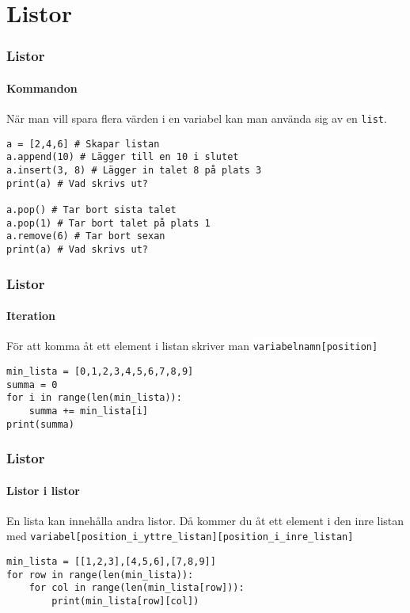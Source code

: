 \documentclass[aspectratio=169]{beamer}
\newcommand{\code}[1]{\colorbox{white}{\lstinline{#1}}}
\begin{document}
\section{Listor}

\begin{frame}[fragile]
	\frametitle{Listor}
	\framesubtitle{Kommandon}
	
	När man vill spara flera värden i en variabel kan man använda sig av en \code{list}.
	
	\begin{lstlisting}
a = [2,4,6] # Skapar listan
a.append(10) # Lägger till en 10 i slutet
a.insert(3, 8) # Lägger in talet 8 på plats 3
print(a) # Vad skrivs ut?

a.pop() # Tar bort sista talet
a.pop(1) # Tar bort talet på plats 1
a.remove(6) # Tar bort sexan
print(a) # Vad skrivs ut?
	\end{lstlisting}
	
\end{frame}

\begin{frame}[fragile]
	\frametitle{Listor}
	\framesubtitle{Iteration}
	
	För att komma åt ett element i listan skriver man \code{variabelnamn[position]}
	
	\begin{lstlisting}
min_lista = [0,1,2,3,4,5,6,7,8,9]
summa = 0
for i in range(len(min_lista)):
    summa += min_lista[i]
print(summa)
	\end{lstlisting}
	
\end{frame}

\begin{frame}[fragile]
	\frametitle{Listor}
	\framesubtitle{Listor i listor}

	En lista kan innehålla andra listor. Då kommer du åt ett element i den inre listan med \code{variabel[position_i_yttre_listan][position_i_inre_listan]}
	
	\begin{lstlisting}
min_lista = [[1,2,3],[4,5,6],[7,8,9]]
for row in range(len(min_lista)):
    for col in range(len(min_lista[row])):
        print(min_lista[row][col])
	\end{lstlisting}

\end{frame}
\end{document}

